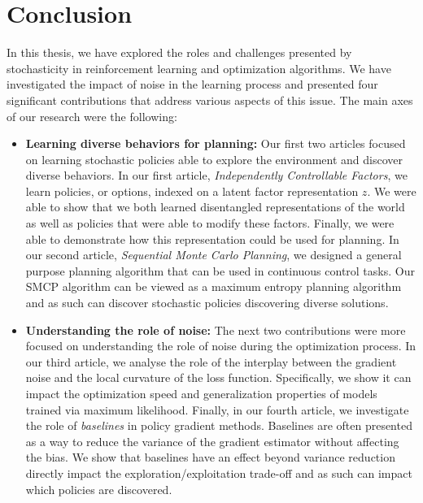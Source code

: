  \chapter*{Conclusion}

In this thesis, we have explored the roles and challenges presented by
stochasticity in reinforcement learning and optimization algorithms. We have
investigated the impact of noise in the learning process and presented four significant contributions that address various aspects of this issue.
The main axes of our research were the following:

\begin{itemize}
    \item \textbf{Learning diverse behaviors for planning:}
        Our first two articles focused on learning stochastic policies able to
        explore the environment and discover diverse behaviors. In our first
        article, \emph{Independently Controllable Factors}, we learn policies,
        or options, indexed on a latent factor representation $z$. We were able
        to show that we both learned disentangled representations of the world
        as well as policies that were able to modify these factors. Finally, we
        were able to demonstrate how this representation could be used for
        planning.
        In our second article, \emph{Sequential Monte Carlo Planning}, we
        designed a general purpose planning algorithm that can be used in
        continuous control tasks. Our SMCP algorithm can be viewed as a maximum
        entropy planning algorithm and as such can discover stochastic policies
        discovering diverse solutions.
    \item \textbf{Understanding the role of noise:} The next two contributions
        were more focused on understanding the role of noise during the
        optimization process. In our third article, we analyse the role of the
        interplay between the gradient noise and the local curvature of the loss
        function. Specifically, we show it can impact the optimization speed and
        generalization properties of models trained via maximum likelihood.
        Finally, in our fourth article, we investigate the role of
        \emph{baselines} in policy gradient methods. Baselines are often
        presented as a way to reduce the variance of the gradient estimator
        without affecting the bias. We show that baselines have an effect beyond
        variance reduction directly impact the
        exploration/exploitation trade-off and as such can impact which policies
        are discovered.
\end{itemize}


